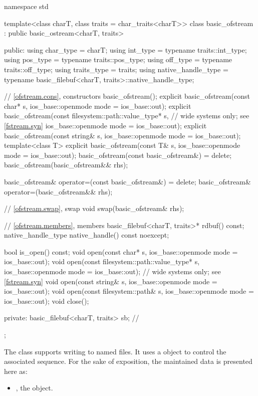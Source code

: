 %
\begin{codeblock}
namespace std {
  template<class charT, class traits = char_traits<charT>>
  class basic_ofstream : public basic_ostream<charT, traits> {
  public:
    using char_type   = charT;
    using int_type    = typename traits::int_type;
    using pos_type    = typename traits::pos_type;
    using off_type    = typename traits::off_type;
    using traits_type = traits;
    using native_handle_type = typename basic_filebuf<charT, traits>::native_handle_type;

    // \ref{ofstream.cons}, constructors
    basic_ofstream();
    explicit basic_ofstream(const char* s,
                            ios_base::openmode mode = ios_base::out);
    explicit basic_ofstream(const filesystem::path::value_type* s,  // wide systems only; see \ref{fstream.syn}
                            ios_base::openmode mode = ios_base::out);
    explicit basic_ofstream(const string& s,
                            ios_base::openmode mode = ios_base::out);
    template<class T>
      explicit basic_ofstream(const T& s, ios_base::openmode mode = ios_base::out);
    basic_ofstream(const basic_ofstream&) = delete;
    basic_ofstream(basic_ofstream&& rhs);

    basic_ofstream& operator=(const basic_ofstream&) = delete;
    basic_ofstream& operator=(basic_ofstream&& rhs);

    // \ref{ofstream.swap}, swap
    void swap(basic_ofstream& rhs);

    // \ref{ofstream.members}, members
    basic_filebuf<charT, traits>* rdbuf() const;
    native_handle_type native_handle() const noexcept;

    bool is_open() const;
    void open(const char* s, ios_base::openmode mode = ios_base::out);
    void open(const filesystem::path::value_type* s,
              ios_base::openmode mode = ios_base::out);     // wide systems only; see \ref{fstream.syn}
    void open(const string& s, ios_base::openmode mode = ios_base::out);
    void open(const filesystem::path& s, ios_base::openmode mode = ios_base::out);
    void close();

  private:
    basic_filebuf<charT, traits> sb;    // \expos
  };
}
\end{codeblock}

\pnum
The class
supports writing to named files.
It uses a
object to control the associated
sequence.
For the sake of exposition, the maintained data is presented here as:
\begin{itemize}
\item
{}, the  object.
\end{itemize}


